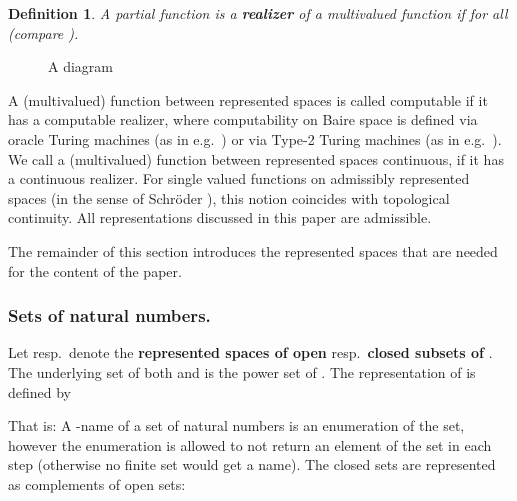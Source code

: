 \documentclass{eptcs-modified}
\newtheorem{definition}[theorem]{Definition}
\newcommand{\demph}{\textbf}
\begin{document}
			\begin{definition}
				A partial function  is a \demph{realizer} of a multivalued function  if  for all  (compare ).
			\end{definition}
			
			\begin{wrapfigure}{r}{3.4cm}
				\vspace{-.5cm}
				\caption{A diagram}\label{figure:diagram}
				\vspace{-.8cm}
			\end{wrapfigure}
			A (multivalued) function between represented spaces is called computable if it has a computable realizer, where computability on Baire space is defined via oracle Turing machines (as in e.g.~\cite{MR1673610}) or via Type-2 Turing machines (as in e.g.~\cite{MR1795407}).
			We call a (multivalued) function between represented spaces continuous, if it has a continuous realizer.
			For single valued functions on admissibly represented spaces (in the sense of Schr\"oder \cite{schroder}), this notion coincides with topological continuity.
			All representations discussed in this paper are admissible.		

			The remainder of this section introduces the represented spaces that are needed for the content of the paper.

			\subsubsection*{Sets of natural numbers.}

				Let  resp.\  denote the \demph{represented spaces of open} resp.\ \demph{closed subsets of }.
				The underlying set of both  and  is the power set of .
				The representation of  is defined by
				
				That is: A -name of a set of natural numbers is an enumeration of the set, however the enumeration is allowed to not return an element of the set in each step (otherwise no finite set would get a name).
				The closed sets  are represented as complements of open sets:
				
\end{document}
